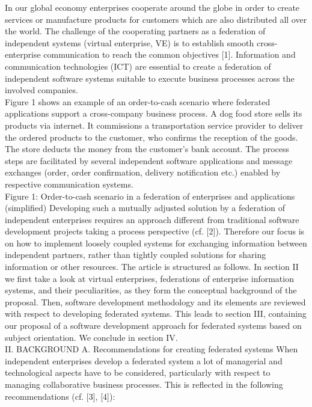 In our global economy enterprises cooperate around the globe in order to create services or manufacture products for customers which are also distributed all over the world. The challenge of the cooperating partners as a federation of independent systems (virtual enterprise, VE) is to establish smooth cross-enterprise communication to reach the common objectives [1]. Information and communication technologies (ICT) are essential to create a federation of independent software systems suitable to execute business processes across the involved companies. 
\\
Figure 1 shows an example of an order-to-cash scenario where federated applications support a cross-company business process. A dog food store sells its products via internet. It commissions a transportation service provider to deliver the ordered products to the customer, who confirms the reception of the goods. The store deducts the money from the customer’s bank account. The process steps are facilitated by several independent software applications and message exchanges (order, order confirmation, delivery notification etc.) enabled by respective communication systems.
\\
Figure 1: Order-to-cash scenario in a federation of enterprises and applications (simplified)
Developing such a mutually adjusted solution by a federation of independent enterprises requires an approach different from traditional software development projects taking a process perspective (cf. [2]). Therefore our focus is on how to implement loosely coupled systems for exchanging information between independent partners, rather than tightly coupled solutions for sharing information or other resources.
The article is structured as follows. In section II we first take a look at virtual enterprises, federations of enterprise information systems, and their peculiarities, as they form the conceptual background of the proposal. Then, software development methodology and its elements are reviewed with respect to developing federated systems. This leads to section III, containing our proposal of a software development approach for federated systems based on subject orientation. We conclude in section IV.
\\
II.	BACKGROUND
A.	Recommendations for creating federated systems
When independent enterprises develop a federated system a lot of managerial and technological aspects have to be considered, particularly with respect to managing collaborative business processes. This is reflected in the following recommendations (cf. [3], [4]):
